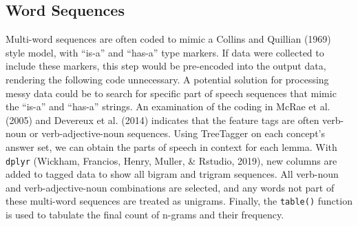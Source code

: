 \documentclass[man]{apa6}
\begin{document}
\hypertarget{word-sequences}{%
\subsection{Word Sequences}\label{word-sequences}}

Multi-word sequences are often coded to mimic a Collins and Quillian (1969) style model, with \enquote{is-a} and \enquote{has-a} type markers. If data were collected to include these markers, this step would be pre-encoded into the output data, rendering the following code unnecessary. A potential solution for processing messy data could be to search for specific part of speech sequences that mimic the \enquote{is-a} and \enquote{has-a} strings. An examination of the coding in McRae et al. (2005) and Devereux et al. (2014) indicates that the feature tags are often verb-noun or verb-adjective-noun sequences. Using TreeTagger on each concept's answer set, we can obtain the parts of speech in context for each lemma. With \texttt{dplyr} (Wickham, Francios, Henry, Muller, \& Rstudio, 2019), new columns are added to tagged data to show all bigram and trigram sequences. All verb-noun and verb-adjective-noun combinations are selected, and any words not part of these multi-word sequences are treated as unigrams. Finally, the \texttt{table()} function is used to tabulate the final count of n-grams and their frequency.

\scriptsize
\end{document}
